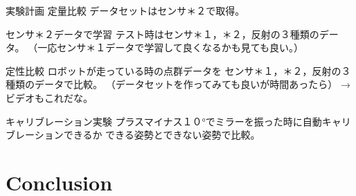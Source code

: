 \documentclass[xelatex,ja=standard]{bxjsarticle}
\begin{document}
実験計画
定量比較
データセットはセンサ＊２で取得。

センサ＊２データで学習
テスト時はセンサ＊１，＊２，反射の３種類のデータ。
（一応センサ＊１データで学習して良くなるかも見ても良い。）



定性比較
ロボットが走っている時の点群データを
センサ＊１，＊２，反射の３種類のデータで比較。
（データセットを作ってみても良いが時間あったら）
→　ビデオもこれだな。

キャリブレーション実験
プラスマイナス１０°でミラーを振った時に自動キャリブレーションできるか
できる姿勢とできない姿勢で比較。

\section{Conclusion}




\end{document}
